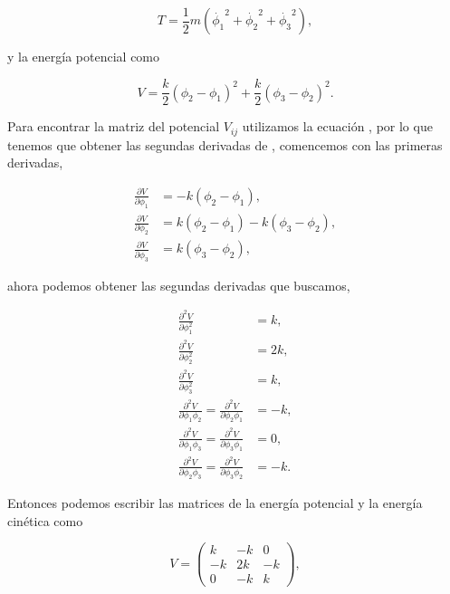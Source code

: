 \documentclass[a4paper,10pt]{article}
\numberwithin{equation}{section}
\begin{document}
\begin{equation}
 T = \frac{1}{2}m(\dot{\phi_1}^2 + \dot{\phi_2}^2 + \dot{\phi_3}^2),
\end{equation}

y la energía potencial como

\begin{equation}
 V = \frac{k}{2}(\phi_2 - \phi_1)^2 + \frac{k}{2}(\phi_3 - \phi_2)^2.
 \label{eq:energpoten2}
\end{equation}

Para encontrar la matriz del potencial $V_{ij}$ utilizamos la ecuación ,
por lo que tenemos que obtener las segundas derivadas de , comencemos 
con las primeras derivadas,

\begin{align*}
 \frac{\partial V}{\partial \phi_1} &= - k (\phi_2 - \phi_1), \\
 \frac{\partial V}{\partial \phi_2} &= k (\phi_2 - \phi_1) - k (\phi_3 - \phi_2), \\
 \frac{\partial V}{\partial \phi_3} &= k (\phi_3 - \phi_2),
\end{align*}

ahora podemos obtener las segundas derivadas que buscamos,

\begin{align*}
 \frac{\partial^2 V}{\partial \phi_1^2} &= k, \\
 \frac{\partial^2 V}{\partial \phi_2^2} &= 2k, \\
 \frac{\partial^2 V}{\partial \phi_3^2} &= k, \\
 \frac{\partial^2 V}{\partial \phi_1\phi_2} = \frac{\partial^2 V}{\partial \phi_2\phi_1}&= -k, \\
 \frac{\partial^2 V}{\partial \phi_1\phi_3} = \frac{\partial^2 V}{\partial \phi_3\phi_1}  &= 0, \\
 \frac{\partial^2 V}{\partial \phi_2\phi_3} =  \frac{\partial^2 V}{\partial \phi_3\phi_2} &= -k.
\end{align*}

Entonces podemos escribir las matrices de la energía potencial y la energía 
cinética como

\begin{equation}
 V = \begin{pmatrix}
      k & -k & 0 \\
      -k & 2k & -k \\
      0 & -k & k
     \end{pmatrix},
\end{equation}
\end{document}
